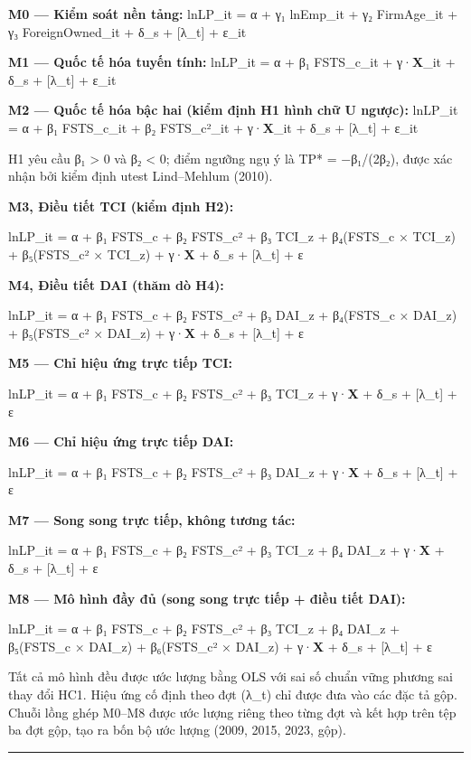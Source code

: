 \documentclass[12pt,a4paper]{article}
\begin{document}
\textbf{M0 --- Kiểm soát nền tảng:} lnLP\_it = α + γ₁ lnEmp\_it + γ₂
FirmAge\_it + γ₃ ForeignOwned\_it + δ\_s + {[}λ\_t{]} + ε\_it

\textbf{M1 --- Quốc tế hóa tuyến tính:} lnLP\_it = α + β₁ FSTS\_c\_it +
γ·\textbf{X}\_it + δ\_s + {[}λ\_t{]} + ε\_it

\textbf{M2 --- Quốc tế hóa bậc hai (kiểm định H1 hình chữ U ngược):}
lnLP\_it = α + β₁ FSTS\_c\_it + β₂ FSTS\_c²\_it + γ·\textbf{X}\_it +
δ\_s + {[}λ\_t{]} + ε\_it

H1 yêu cầu β₁ \textgreater{} 0 và β₂ \textless{} 0; điểm ngưỡng ngụ ý là
TP* = −β₁/(2β₂), được xác nhận bởi kiểm định utest Lind--Mehlum (2010).

\textbf{M3, Điều tiết TCI (kiểm định H2):}

lnLP\_it = α + β₁ FSTS\_c + β₂ FSTS\_c² + β₃ TCI\_z + β₄(FSTS\_c ×
TCI\_z) + β₅(FSTS\_c² × TCI\_z) + γ·\textbf{X} + δ\_s + {[}λ\_t{]} + ε

\textbf{M4, Điều tiết DAI (thăm dò H4):}

lnLP\_it = α + β₁ FSTS\_c + β₂ FSTS\_c² + β₃ DAI\_z + β₄(FSTS\_c ×
DAI\_z) + β₅(FSTS\_c² × DAI\_z) + γ·\textbf{X} + δ\_s + {[}λ\_t{]} + ε

\textbf{M5 --- Chỉ hiệu ứng trực tiếp TCI:}

lnLP\_it = α + β₁ FSTS\_c + β₂ FSTS\_c² + β₃ TCI\_z + γ·\textbf{X} +
δ\_s + {[}λ\_t{]} + ε

\textbf{M6 --- Chỉ hiệu ứng trực tiếp DAI:}

lnLP\_it = α + β₁ FSTS\_c + β₂ FSTS\_c² + β₃ DAI\_z + γ·\textbf{X} +
δ\_s + {[}λ\_t{]} + ε

\textbf{M7 --- Song song trực tiếp, không tương tác:}

lnLP\_it = α + β₁ FSTS\_c + β₂ FSTS\_c² + β₃ TCI\_z + β₄ DAI\_z +
γ·\textbf{X} + δ\_s + {[}λ\_t{]} + ε

\textbf{M8 --- Mô hình đầy đủ (song song trực tiếp + điều tiết DAI):}

lnLP\_it = α + β₁ FSTS\_c + β₂ FSTS\_c² + β₃ TCI\_z + β₄ DAI\_z +
β₅(FSTS\_c × DAI\_z) + β₆(FSTS\_c² × DAI\_z) + γ·\textbf{X} + δ\_s +
{[}λ\_t{]} + ε

Tất cả mô hình đều được ước lượng bằng OLS với sai số chuẩn vững phương
sai thay đổi HC1. Hiệu ứng cố định theo đợt (λ\_t) chỉ được đưa vào các
đặc tả gộp. Chuỗi lồng ghép M0--M8 được ước lượng riêng theo từng đợt và
kết hợp trên tệp ba đợt gộp, tạo ra bốn bộ ước lượng (2009, 2015, 2023,
gộp).

\begin{center}\rule{0.5\linewidth}{0.5pt}\end{center}
\end{document}
